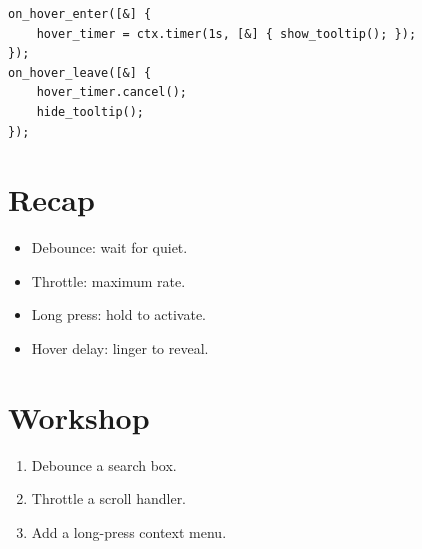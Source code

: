 \begin{lstlisting}
on_hover_enter([&] {
    hover_timer = ctx.timer(1s, [&] { show_tooltip(); });
});
on_hover_leave([&] {
    hover_timer.cancel();
    hide_tooltip();
});
\end{lstlisting}

\section{Recap}

\begin{recap}
\begin{itemize}[leftmargin=*]
  \item Debounce: wait for quiet.
  \item Throttle: maximum rate.
  \item Long press: hold to activate.
  \item Hover delay: linger to reveal.
\end{itemize}
\end{recap}

\section*{Workshop}

\begin{enumerate}[leftmargin=*]
  \item Debounce a search box.
  \item Throttle a scroll handler.
  \item Add a long-press context menu.
\end{enumerate}
